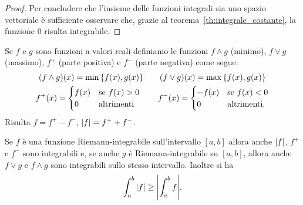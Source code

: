 \begin{proof}
Per concludere che l'insieme delle funzioni integrali sia uno spazio vettoriale
è sufficiente osservare che, grazie al teorema~\ref{th:integrale_costante},
la funzione $0$ risulta integrabile.
\end{proof}

\begin{theorem}
\label{th:reticolo}
Se $f$ e $g$ sono funzioni a valori reali definiamo le
funzioni $f\wedge g$ (minimo), $f \vee g$ (massimo),
$f^+$ (parte positiva) e $f^-$ (parte negativa) come segue:
\begin{gather*}
  (f \wedge g)(x) = \min{\left\{ f(x), g(x) \right\}}  \qquad
  (f \vee g)(x) = \max{\left\{ f(x), g(x) \right\}} \\
  f^+ (x) =
      \begin{cases}
      f(x) & \text{se $f(x)> 0$}\\
      0 & \text{altrimenti}
      \end{cases} \qquad
  f^- (x) =
      \begin{cases}
      -f(x) & \text{se $f(x)< 0$}\\
      0 & \text{altrimenti.}
      \end{cases}
\end{gather*}
Risulta $f= f^+ - f^-$, ${\left|f\right|}=f^+ + f^-$.

Se $f$ è una funzione Riemann-integrabile sull'intervallo $[a,b]$ allora
anche ${\left|f\right|}$, $f^+$ e $f^-$ sono integrabili e, se
anche $g$ è Riemann-integrabile su $[a,b]$, allora anche $f\vee g$ e $f\wedge g$
sono integrabili sullo stesso intervallo.
Inoltre si ha 
\begin{equation}\label{eq:489732}
  \int_a^b {\left|f\right|} \ge {\left|\int_a^b f\right|}.  
\end{equation}
\end{theorem}
%
